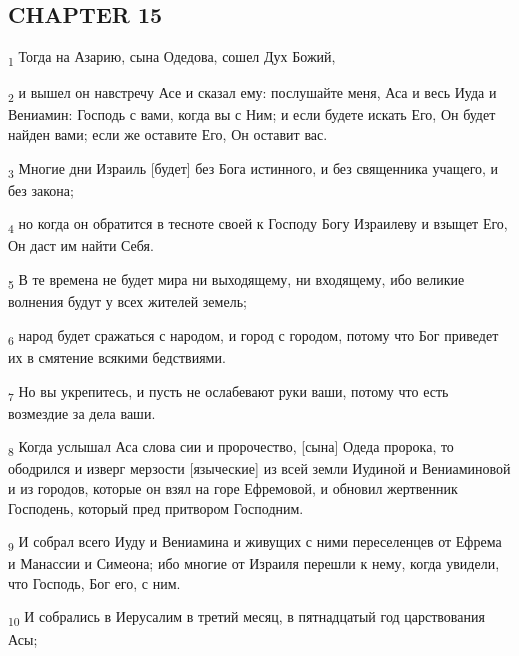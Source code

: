 \subsection{CHAPTER 15}
\begin{tcolorbox}
\textsubscript{1} Тогда на Азарию, сына Одедова, сошел Дух Божий,
\end{tcolorbox}
\begin{tcolorbox}
\textsubscript{2} и вышел он навстречу Асе и сказал ему: послушайте меня, Аса и весь Иуда и Вениамин: Господь с вами, когда вы с Ним; и если будете искать Его, Он будет найден вами; если же оставите Его, Он оставит вас.
\end{tcolorbox}
\begin{tcolorbox}
\textsubscript{3} Многие дни Израиль [будет] без Бога истинного, и без священника учащего, и без закона;
\end{tcolorbox}
\begin{tcolorbox}
\textsubscript{4} но когда он обратится в тесноте своей к Господу Богу Израилеву и взыщет Его, Он даст им найти Себя.
\end{tcolorbox}
\begin{tcolorbox}
\textsubscript{5} В те времена не будет мира ни выходящему, ни входящему, ибо великие волнения будут у всех жителей земель;
\end{tcolorbox}
\begin{tcolorbox}
\textsubscript{6} народ будет сражаться с народом, и город с городом, потому что Бог приведет их в смятение всякими бедствиями.
\end{tcolorbox}
\begin{tcolorbox}
\textsubscript{7} Но вы укрепитесь, и пусть не ослабевают руки ваши, потому что есть возмездие за дела ваши.
\end{tcolorbox}
\begin{tcolorbox}
\textsubscript{8} Когда услышал Аса слова сии и пророчество, [сына] Одеда пророка, то ободрился и изверг мерзости [языческие] из всей земли Иудиной и Вениаминовой и из городов, которые он взял на горе Ефремовой, и обновил жертвенник Господень, который пред притвором Господним.
\end{tcolorbox}
\begin{tcolorbox}
\textsubscript{9} И собрал всего Иуду и Вениамина и живущих с ними переселенцев от Ефрема и Манассии и Симеона; ибо многие от Израиля перешли к нему, когда увидели, что Господь, Бог его, с ним.
\end{tcolorbox}
\begin{tcolorbox}
\textsubscript{10} И собрались в Иерусалим в третий месяц, в пятнадцатый год царствования Асы;
\end{tcolorbox}
